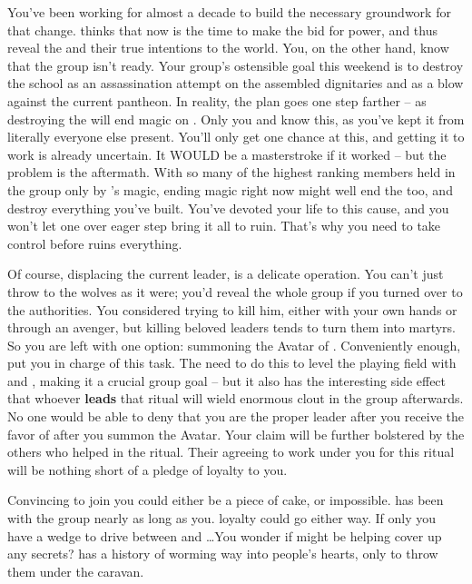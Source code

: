 \documentclass[char]{GL2020}
\begin{document}
You’ve been working for almost a decade to build the necessary groundwork for that change. \cChupLeader{} thinks that now is the time to make the bid for power, and thus reveal the \pGoaties{} and their true intentions to the world. You, on the other hand, know that the group isn’t ready. Your group’s ostensible goal this weekend is to destroy the school as an assassination attempt on the assembled dignitaries and as a blow against the current  pantheon. In reality, the plan goes one step farther -- as destroying the \pSc{} will end magic on \pEarth{}. Only you and \cChupLeader{} know this, as you’ve kept it from literally everyone else present. You’ll only get one chance at this, and getting it to work is already uncertain. It WOULD be a masterstroke if it worked -- but the problem is the aftermath. With so many of the highest ranking members held in the group only by \cChupLeader{}’s magic, ending magic right now might well end the \pGoaties{} too, and destroy everything you’ve built. You’ve devoted your life to this cause, and you won’t let one over eager step bring it all to ruin. That’s why you need to take control before \cChupLeader{} ruins everything.

Of course, displacing the current leader, \cChupLeader{} is a delicate operation. You can’t just throw \cChupLeader{\them} to the wolves as it were; you’d reveal the whole group if you turned \cChupLeader{\them} over to the authorities. You considered trying to kill him, either with your own hands or through an avenger, but killing beloved leaders tends to turn them into martyrs. So you are left with one option: summoning the Avatar of \cGenesis{}. Conveniently enough, \cChupLeader{} put you in charge of this task. The \pGoaties{} need to do this to level the playing field with \cTechGod{} and \cFarmGod{}, making it a crucial group goal -- but it also has the interesting side effect that whoever \textbf{leads} that ritual will wield enormous clout in the group afterwards. No one would be able to deny that you are the proper leader after you receive the favor of \cGenesis{} after you summon the Avatar. Your claim will be further bolstered by the others who helped in the ritual. Their agreeing to work under you for this ritual will be nothing short of a pledge of loyalty to you.

Convincing \cChupInventor{} to join you could either be a piece of cake, or impossible. \cChupInventor{} has been with the group nearly as long as you. \cChupInventor{\Their} loyalty could go either way. If only you have a wedge to drive between \cChupInventor{} and \cChupLeader{}\ldots You wonder if \cChupLeader{} might be helping \cChupInventor{} cover up any secrets? \cChupLeader{} has a history of worming \cChupLeader{\their} way into people’s hearts, only to throw them under the caravan.
\end{document}
